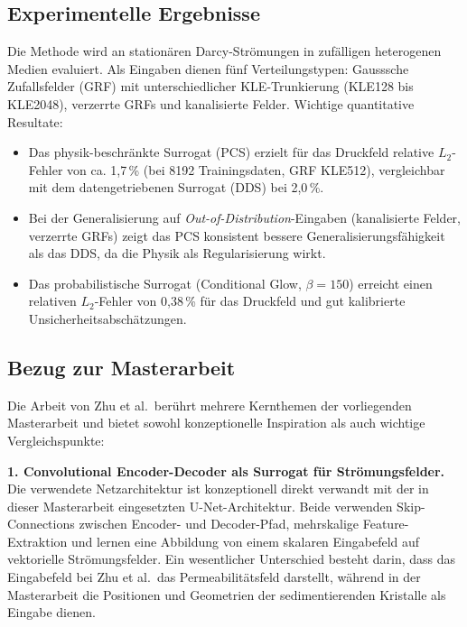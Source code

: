\documentclass[a4paper,12pt]{article}
\begin{document}
\subsection*{Experimentelle Ergebnisse}

Die Methode wird an stationären Darcy-Strömungen in zufälligen heterogenen Medien
evaluiert. Als Eingaben dienen fünf Verteilungstypen: Gausssche Zufallsfelder (GRF)
mit unterschiedlicher KLE-Trunkierung (KLE128 bis KLE2048), verzerrte GRFs und
kanalisierte Felder. Wichtige quantitative Resultate:

\begin{itemize}
    \item Das physik-beschränkte Surrogat (PCS) erzielt für das Druckfeld relative
          $L_2$-Fehler von ca. 1,7\,\% (bei 8192 Trainingsdaten, GRF KLE512),
          vergleichbar mit dem datengetriebenen Surrogat (DDS) bei 2,0\,\%.

    \item Bei der Generalisierung auf \emph{Out-of-Distribution}-Eingaben (kanalisierte
          Felder, verzerrte GRFs) zeigt das PCS konsistent bessere Generalisierungs\-fähigkeit
          als das DDS, da die Physik als Regularisierung wirkt.

    \item Das probabilistische Surrogat (Conditional Glow, $\beta = 150$) erreicht
          einen relativen $L_2$-Fehler von 0,38\,\% für das Druckfeld und gut
          kalibrierte Unsicherheitsabschätzungen.
\end{itemize}

\subsection*{Bezug zur Masterarbeit}

Die Arbeit von Zhu et al.\ berührt mehrere Kernthemen der vorliegenden Masterarbeit
und bietet sowohl konzeptionelle Inspiration als auch wichtige Vergleichspunkte:

\textbf{1. Convolutional Encoder-Decoder als Surrogat für Strömungsfelder.}
Die verwendete Netzarchitektur ist konzeptionell direkt verwandt mit der in dieser
Masterarbeit eingesetzten U-Net-Architektur. Beide verwenden Skip-Connections zwischen
Encoder- und Decoder-Pfad, mehrskalige Feature-Extraktion und lernen eine
Abbildung von einem skalaren Eingabefeld auf vektorielle Strömungsfelder.
Ein wesentlicher Unterschied besteht darin, dass das Eingabefeld bei Zhu et al.\ das
Permeabilitätsfeld darstellt, während in der Masterarbeit die Positionen und
Geometrien der sedi\-men\-tierenden Kristalle als Eingabe dienen.
\end{document}
